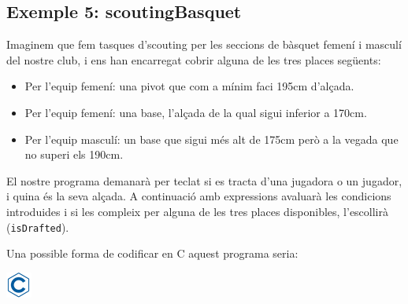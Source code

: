 \documentclass[]{book}
\providecommand{\tightlist}{%
  \setlength{\itemsep}{0pt}\setlength{\parskip}{0pt}}
\begin{document}
\subsection{Exemple 5: scoutingBasquet}\label{exemple-5-scoutingbasquet}

Imaginem que fem tasques d'scouting per les seccions de bàsquet femení i
masculí del nostre club, i ens han encarregat cobrir alguna de les tres
places següents:

\begin{itemize}
\tightlist
\item
  Per l'equip femení: una pivot que com a mínim faci 195cm d'alçada.
\item
  Per l'equip femení: una base, l'alçada de la qual sigui inferior a
  170cm.
\item
  Per l'equip masculí: un base que sigui més alt de 175cm però a la
  vegada que no superi els 190cm.
\end{itemize}

El nostre programa demanarà per teclat si es tracta d'una jugadora o un
jugador, i quina és la seva alçada. A continuació amb expressions
avaluarà les condicions introduides i si les compleix per alguna de les
tres places disponibles, l'escollirà (\texttt{isDrafted}).

Una possible forma de codificar en C aquest programa seria:

\includegraphics{./img/c.png}
\end{document}
